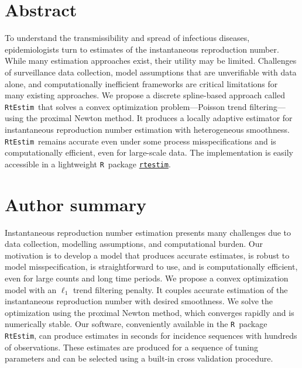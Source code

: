 \documentclass[10pt,letterpaper]{article}
\newcommand{\R}{\texttt{R}}
\def\RtEstim{\texttt{RtEstim}}
\begin{document}
\section*{Abstract}

To understand the transmissibility and spread of infectious diseases,
epidemiologists turn to estimates of the instantaneous reproduction number.
While many estimation approaches exist, their utility may be limited. 
Challenges of surveillance data collection, model assumptions
that are unverifiable with data alone, and 
computationally inefficient frameworks are critical limitations for many
existing approaches. We propose a discrete spline-based approach called 
\RtEstim\ that solves a convex optimization problem---Poisson trend filtering---using the proximal Newton method. It produces a locally adaptive 
estimator for instantaneous reproduction number estimation with heterogeneous 
smoothness. \RtEstim\ remains accurate even under some process 
misspecifications and is computationally efficient, even for large-scale 
data. The implementation is easily accessible in a lightweight \R\ 
package \href{https://dajmcdon.github.io/rtestim/index.html}{\texttt{rtestim}}.


\section*{Author summary}

Instantaneous reproduction number estimation presents many challenges due to data
collection, modelling assumptions, and computational burden. Our
motivation is to develop a model that produces accurate estimates, is robust to
model misspecification, is straightforward to use, and is computationally
efficient, even for large counts and long time periods. We propose a convex
optimization model with an $\ell_1$ trend filtering penalty. It couples accurate
estimation of the instantaneous reproduction number with desired smoothness. We
solve the optimization using the proximal Newton method, which converges rapidly
and is numerically stable. Our software, conveniently available in the \R\
package \RtEstim, can produce estimates in seconds for incidence sequences with
hundreds of observations. These estimates are produced for a sequence of tuning
parameters and can be selected using a built-in cross validation procedure. 
\end{document}
